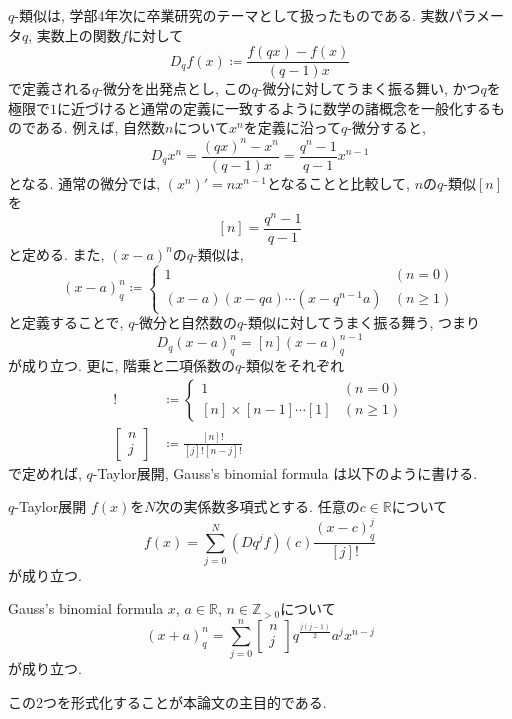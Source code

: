 \documentclass[11pt]{jsreport}
\theoremstyle{mystyle}
\newcommand{\Z}{\mathbb{Z}}
\newcommand{\R}{\mathbb{R}}
\newcommand{\qcoe}[2]{\left[\begin{array}{ccc}#1\\#2\end{array}\right]}
\newcommand{\0}{\textbf{0}}
\begin{document}
$q$-類似は, 学部4年次に卒業研究のテーマとして扱ったものである. 実数パラメータ$q$, 実数上の関数$f$に対して
\[
  D_q f(x) \coloneqq \frac{f(qx) - f(x)}{(q - 1) x}
\]
で定義される$q$-微分を出発点とし, この$q$-微分に対してうまく振る舞い, かつ$q$を極限で$1$に近づけると通常の定義に一致するように数学の諸概念を一般化するものである.
例えば, 自然数$n$について$x^n$を定義に沿って$q$-微分すると, 
\[
  D_q x^n = \frac{(qx)^n - x^n}{(q - 1) x} = \frac{q^n - 1}{q - 1} x^{n - 1}
\]
となる. 通常の微分では, $(x^n)' = n x^{n - 1}$となることと比較して, $n$の$q$-類似$[n]$を
\[
  [n] = \frac{q^n - 1}{q - 1}
\]
と定める. また, $(x - a)^n$の$q$-類似は, 
\[
  (x - a)^n_q \coloneqq \begin{cases}
                                  1 & (n = 0) \\
                                  (x - a) (x - qa) \cdots (x - q^{n - 1} a) & (n \ge 1)
                                \end{cases}
\]
と定義することで, $q$-微分と自然数の$q$-類似に対してうまく振る舞う, つまり
\[
  D_q (x - a)^n_q = [n](x - a)^{n - 1}_q
\]
が成り立つ. 更に, 階乗と二項係数の$q$-類似をそれぞれ
\begin{align*}
  [n]! &\coloneqq \begin{cases}
                        1 & (n = 0)\\
                        [n] \times [n   - 1] \cdots [1] & (n \ge 1)
                      \end{cases}\\
  \qcoe{n}{j} &\coloneqq \frac{[n]!}{[j]![n - j]!}
\end{align*}
で定めれば, $q$-Taylor展開, Gauss's binomial formula は以下のように書ける. 
\begin{itembox}{$q$-Taylor展開}
  $f(x)$を$N$次の実係数多項式とする. 任意の$c \in \R$について
  \[
    f(x) = \sum_{j = 0}^N (Dq^j f) (c) \frac{(x - c)^j_q}{[j]!}
  \]
  が成り立つ. 
\end{itembox}
\begin{itembox}{Gauss's binomial formula}
  $x$, $a \in \R$, $n \in \Z_{>0}$について
  \[
    (x+a)^n_q = \sum_{j=0}^n \qcoe{n}{j} q^{\frac{j(j-1)}{2}} a^j x^{n-j}
  \]
  が成り立つ. 
\end{itembox}
この2つを形式化することが本論文の主目的である. 
\end{document}
